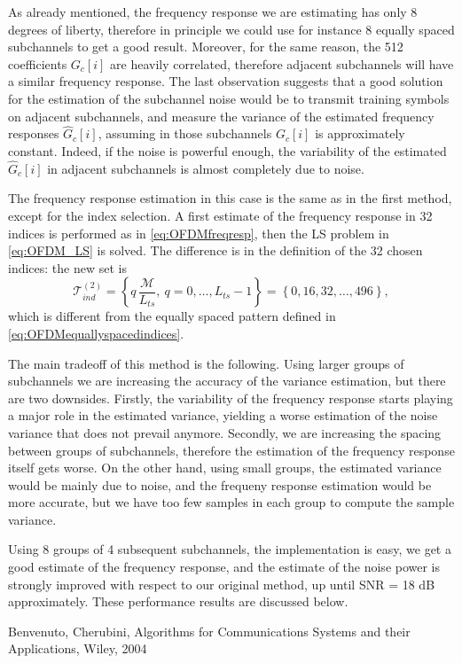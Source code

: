 \documentclass[10pt]{article}
\newcommand{\ofdM} {\mathcal{M}}
\begin{document}
As already mentioned, the frequency response we are estimating has only 8 degrees of liberty, therefore in principle we could use for instance 8 equally spaced subchannels to get a good result. Moreover, for the same reason, the 512 coefficients $G_c[i]$ are heavily correlated, therefore adjacent subchannels will have a similar frequency response. The last observation suggests that a good solution for the estimation of the subchannel noise would be to transmit training symbols on adjacent subchannels, and measure the variance of the estimated frequency responses $\hat{G}_c[i]$, assuming in those subchannels $G_c[i]$ is approximately constant. Indeed, if the noise is powerful enough, the variability of the estimated $\hat{G}_c[i]$ in adjacent subchannels is almost completely due to noise.

The frequency response estimation in this case is the same as in the first method, except for the index selection. A first estimate of the frequency response in 32 indices is performed as in \eqref{eq:OFDMfreqresp}, then the LS problem in \eqref{eq:OFDM_LS} is solved. The difference is in the definition of the 32 chosen indices: the new set is
\begin{equation}
	\mathcal{T}_{ind}^{(2)} = \left\{q \, \frac{\ofdM}{L_{ts}}, \ q = 0,\ldots,L_{ts}-1 \right\}  = \left\{ 0, 16, 32, \dots, 496 \right\},
\end{equation} %
which is different from the equally spaced pattern defined in \eqref{eq:OFDMequallyspacedindices}.

The main tradeoff of this method is the following. Using larger groups of subchannels we are increasing the accuracy of the variance estimation, but there are two downsides. Firstly, the variability of the frequency response starts playing a major role in the estimated variance, yielding a worse estimation of the noise variance that does not prevail anymore. Secondly, we are increasing the spacing between groups of subchannels, therefore the estimation of the frequency response itself gets worse. On the other hand, using small groups, the estimated variance would be mainly due to noise, and the frequeny response estimation would be more accurate, but we have too few samples in each group to compute the sample variance.

Using 8 groups of 4 subsequent subchannels, the implementation is easy, we get a good estimate of the frequency response, and the estimate of the noise power is strongly improved with respect to our original method, up until SNR = 18 dB approximately. These performance results are discussed below.


\begin{thebibliography}{10}

Benvenuto, Cherubini, Algorithms for Communications Systems and their Applications, Wiley, 2004

\end{thebibliography}
\end{document}
